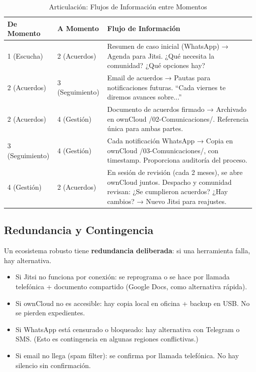 ﻿\documentclass[
  spanish,
  letterpaper, oneside
]{article}
\begin{document}
\begin{table}[h]
\centering
\small
\begin{tabular}{@{}llp{7cm}@{}}
\toprule
\textbf{De Momento} & \textbf{A Momento} & \textbf{Flujo de Información} \\
\midrule
1 (Escucha) & 2 (Acuerdos) & Resumen de caso inicial (WhatsApp) → Agenda 
para Jitsi. ¿Qué necesita la comunidad? ¿Qué opciones hay? \\
\midrule
2 (Acuerdos) & 3 (Seguimiento) & Email de acuerdos → Pautas para notificaciones 
futuras. ``Cada viernes te diremos avances sobre...'' \\
\midrule
2 (Acuerdos) & 4 (Gestión) & Documento de acuerdos firmado → Archivado en ownCloud 
/02-Comunicaciones/. Referencia única para ambas partes. \\
\midrule
3 (Seguimiento) & 4 (Gestión) & Cada notificación WhatsApp → Copia en ownCloud 
/03-Comunicaciones/, con timestamp. Proporciona auditoría del proceso. \\
\midrule
4 (Gestión) & 2 (Acuerdos) & En sesión de revisión (cada 2 meses), se abre 
ownCloud juntos. Despacho y comunidad revisan: ¿Se cumplieron acuerdos? 
¿Hay cambios? → Nuevo Jitsi para reajustes. \\
\bottomrule
\end{tabular}
\caption{Articulación: Flujos de Información entre Momentos}
\label{tab:flujos}
\end{table}

\subsection{Redundancia y Contingencia}

Un ecosistema robusto tiene \textbf{redundancia deliberada}: si una herramienta falla, 
hay alternativa.

\begin{itemize}
  \item Si Jitsi no funciona por conexión: se reprograma o se hace por llamada telefónica 
  + documento compartido (Google Docs, como alternativa rápida).
  
  \item Si ownCloud no es accesible: hay copia local en oficina + backup en USB. 
  No se pierden expedientes.
  
  \item Si WhatsApp está censurado o bloqueado: hay alternativa con Telegram o SMS. 
  (Esto es contingencia en algunas regiones conflictivas.)
  
  \item Si email no llega (spam filter): se confirma por llamada telefónica. No hay silencio 
  sin confirmación.
\end{itemize}
\end{document}
